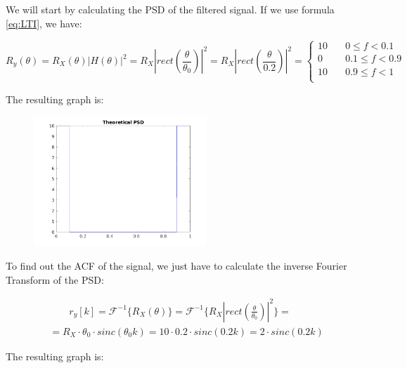 \documentclass[a4paper,11pt]{article}
\begin{document}
We will start by calculating the PSD of the filtered signal. If we use formula
\eqref{eq:LTI}, we have:

\begin{equation}\label{eq:R_hd_th}
   R_y(\theta) = R_X(\theta) |H(\theta)|^2 =
   R_X |rect(\frac{\theta}{\theta_0})|^2 =
   R_X |rect(\frac{\theta}{0.2})|^2 =
   \begin{cases}
     10 &\quad 0 \le f < 0.1\\
     0 &\quad 0.1 \le f < 0.9\\
     10 &\quad 0.9 \le f < 1\\
   \end{cases}
\end{equation}

\newpage

The resulting graph is:

\begin{figure}[!hp]
    \begin{center}
      \includegraphics[width=0.58\textwidth]{images/study1/R_hd_th.png}
    \end{center}
\end{figure}

To find out the ACF of the signal, we just have to calculate the inverse Fourier
Transform of the PSD:

\begin{equation}\label{eq:r_hd_th}
  \begin{split}
   & \qquad r_y[k] = \mathcal{F}^{-1}\{R_X(\theta)\} =
   \mathcal{F}^{-1}\{R_X|rect(\frac{\theta}{\theta_0})|^2\} = \\
   & = R_X\cdot\theta_0\cdot sinc(\theta_0 k) =
   10\cdot0.2\cdot sinc(0.2 k) = 2\cdot sinc(0.2 k)
 \end{split}
 \end{equation}

The resulting graph is:
\end{document}
